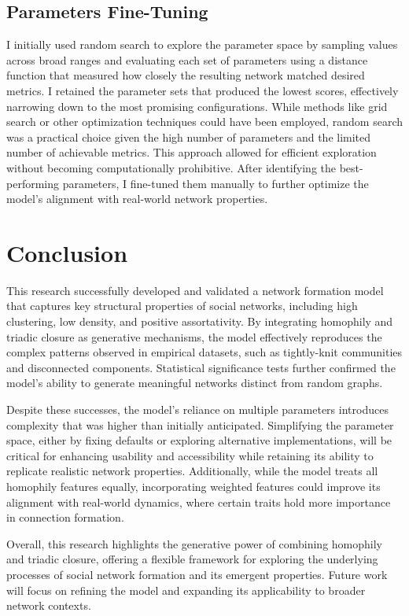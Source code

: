 \documentclass[runningheads]{llncs}
\begin{document}
\subsection{Parameters Fine-Tuning}
I initially used random search to explore the parameter space by sampling values across broad ranges and evaluating each set of parameters using a distance function that measured how closely the resulting network matched desired metrics. I retained the parameter sets that produced the lowest scores, effectively narrowing down to the most promising configurations. While methods like grid search or other optimization techniques could have been employed, random search was a practical choice given the high number of parameters and the limited number of achievable metrics. This approach allowed for efficient exploration without becoming computationally prohibitive. After identifying the best-performing parameters, I fine-tuned them manually to further optimize the model's alignment with real-world network properties.

\section{Conclusion}
This research successfully developed and validated a network formation model that captures key structural properties of social networks, including high clustering, low density, and positive assortativity. By integrating homophily and triadic closure as generative mechanisms, the model effectively reproduces the complex patterns observed in empirical datasets, such as tightly-knit communities and disconnected components. Statistical significance tests further confirmed the model's ability to generate meaningful networks distinct from random graphs.

Despite these successes, the model's reliance on multiple parameters introduces complexity that was higher than initially anticipated. Simplifying the parameter space, either by fixing defaults or exploring alternative implementations, will be critical for enhancing usability and accessibility while retaining its ability to replicate realistic network properties. Additionally, while the model treats all homophily features equally, incorporating weighted features could improve its alignment with real-world dynamics, where certain traits hold more importance in connection formation.

Overall, this research highlights the generative power of combining homophily and triadic closure, offering a flexible framework for exploring the underlying processes of social network formation and its emergent properties. Future work will focus on refining the model and expanding its applicability to broader network contexts.

\printbibliography
\end{document}
